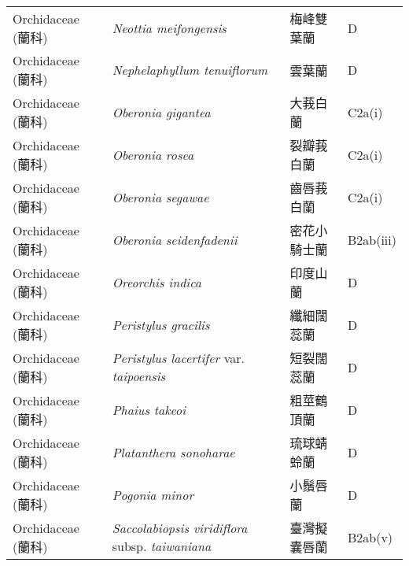 \begin{longtable}{p{3cm}p{5cm}p{3cm}p{4cm}}
    Orchidaceae (蘭科) & \textit{Neottia meifongensis}  & 梅峰雙葉蘭 & D \index{Neottia@\textit{Neottia}!meifongensis@\textit{meifongensis}}  \index{梅峰雙葉蘭} \\
    Orchidaceae (蘭科) & \textit{Nephelaphyllum tenuiflorum}  & 雲葉蘭 & D \index{Nephelaphyllum@\textit{Nephelaphyllum}!tenuiflorum@\textit{tenuiflorum}}  \index{雲葉蘭} \\
    Orchidaceae (蘭科) & \textit{Oberonia gigantea}  & 大莪白蘭 & C2a(i) \index{Oberonia@\textit{Oberonia}!gigantea@\textit{gigantea}}  \index{大莪白蘭} \\
    Orchidaceae (蘭科) & \textit{Oberonia rosea}  & 裂瓣莪白蘭 & C2a(i) \index{Oberonia@\textit{Oberonia}!rosea@\textit{rosea}}  \index{裂瓣莪白蘭} \\
    Orchidaceae (蘭科) & \textit{Oberonia segawae}  & 齒唇莪白蘭 & C2a(i) \index{Oberonia@\textit{Oberonia}!segawae@\textit{segawae}}  \index{齒唇莪白蘭} \\
    Orchidaceae (蘭科) & \textit{Oberonia seidenfadenii}  & 密花小騎士蘭 & B2ab(iii) \index{Oberonia@\textit{Oberonia}!seidenfadenii@\textit{seidenfadenii}}  \index{密花小騎士蘭} \\
    Orchidaceae (蘭科) & \textit{Oreorchis indica}  & 印度山蘭 & D \index{Oreorchis@\textit{Oreorchis}!indica@\textit{indica}}  \index{印度山蘭} \\
    Orchidaceae (蘭科) & \textit{Peristylus gracilis}  & 纖細闊蕊蘭 & D \index{Peristylus@\textit{Peristylus}!gracilis@\textit{gracilis}}  \index{纖細闊蕊蘭} \\
    Orchidaceae (蘭科) & \textit{Peristylus lacertifer} var. \textit{taipoensis}  & 短裂闊蕊蘭 & D \index{Peristylus@\textit{Peristylus}!lacertifer@\textit{lacertifer}!var. taipoensis@var. \textit{taipoensis}}  \index{短裂闊蕊蘭} \\
    Orchidaceae (蘭科) & \textit{Phaius takeoi}  & 粗莖鶴頂蘭 & D \index{Phaius@\textit{Phaius}!takeoi@\textit{takeoi}}  \index{粗莖鶴頂蘭} \\
    Orchidaceae (蘭科) & \textit{Platanthera sonoharae}  & 琉球蜻蛉蘭 & D \index{Platanthera@\textit{Platanthera}!sonoharae@\textit{sonoharae}}  \index{琉球蜻蛉蘭} \\
    Orchidaceae (蘭科) & \textit{Pogonia minor}  & 小鬚唇蘭 & D \index{Pogonia@\textit{Pogonia}!minor@\textit{minor}}  \index{小鬚唇蘭} \\
    Orchidaceae (蘭科) & \textit{Saccolabiopsis viridiflora} subsp. \textit{taiwaniana}  & 臺灣擬囊唇蘭 & B2ab(v) \index{Saccolabiopsis@\textit{Saccolabiopsis}!viridiflora@\textit{viridiflora}!subsp. taiwaniana@subsp. \textit{taiwaniana}}  \index{臺灣擬囊唇蘭} \\

\end{longtable}

